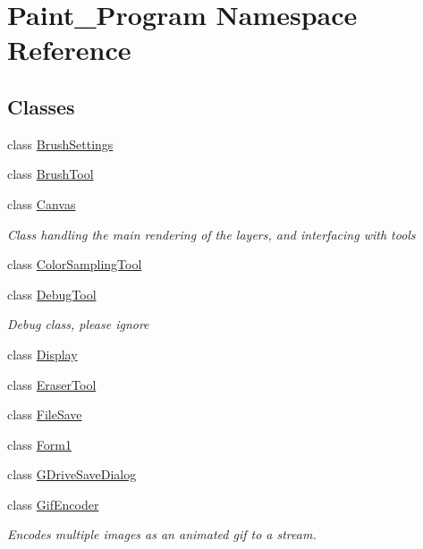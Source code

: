 \hypertarget{namespace_paint___program}{}\section{Paint\+\_\+\+Program Namespace Reference}
\label{namespace_paint___program}
\subsection*{Classes}
\begin{DoxyCompactItemize}
\item 
class \mbox{\hyperlink{class_paint___program_1_1_brush_settings}{Brush\+Settings}}
\item 
class \mbox{\hyperlink{class_paint___program_1_1_brush_tool}{Brush\+Tool}}
\item 
class \mbox{\hyperlink{class_paint___program_1_1_canvas}{Canvas}}
\begin{DoxyCompactList}\small\item\em Class handling the main rendering of the layers, and interfacing with tools \end{DoxyCompactList}\item 
class \mbox{\hyperlink{class_paint___program_1_1_color_sampling_tool}{Color\+Sampling\+Tool}}
\item 
class \mbox{\hyperlink{class_paint___program_1_1_debug_tool}{Debug\+Tool}}
\begin{DoxyCompactList}\small\item\em Debug class, please ignore \end{DoxyCompactList}\item 
class \mbox{\hyperlink{class_paint___program_1_1_display}{Display}}
\item 
class \mbox{\hyperlink{class_paint___program_1_1_eraser_tool}{Eraser\+Tool}}
\item 
class \mbox{\hyperlink{class_paint___program_1_1_file_save}{File\+Save}}
\item 
class \mbox{\hyperlink{class_paint___program_1_1_form1}{Form1}}
\item 
class \mbox{\hyperlink{class_paint___program_1_1_g_drive_save_dialog}{G\+Drive\+Save\+Dialog}}
\item 
class \mbox{\hyperlink{class_paint___program_1_1_gif_encoder}{Gif\+Encoder}}
\begin{DoxyCompactList}\small\item\em Encodes multiple images as an animated gif to a stream. ~\newline

\end{DoxyCompactList}
\end{DoxyCompactItemize}

